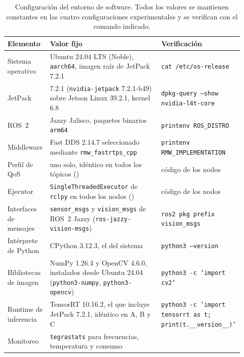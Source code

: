 \begin{table}[htbp]
  \centering
  \caption[Configuración del entorno de software]{Configuración del entorno de
  software. Todos los valores se mantienen constantes en las cuatro
  configuraciones experimentales y se verifican con el comando indicado.}
  \label{tab:software-environment}
  \begin{tabular}{@{}L{0.17\linewidth}L{0.47\linewidth}L{0.30\linewidth}@{}}
    \toprule
    \textbf{Elemento} & \textbf{Valor fijo} & \textbf{Verificación} \\
    \midrule
    Sistema operativo & Ubuntu 24.04 LTS (Noble), \texttt{aarch64}, imagen
      raíz de JetPack 7.2.1 & \texttt{cat /etc/os-release} \\
    JetPack & 7.2.1 (\texttt{nvidia-jetpack} 7.2.1-b49) sobre Jetson Linux
      39.2.1, kernel 6.8 & \texttt{dpkg-query --show nvidia-l4t-core} \\
    ROS~2 & Jazzy Jalisco, paquetes binarios \texttt{arm64} &
      \texttt{printenv ROS\_DISTRO} \\
    Middleware & Fast DDS 2.14.7 seleccionado mediante
      \texttt{rmw\_fastrtps\_cpp} & \texttt{printenv RMW\_IMPLEMENTATION} \\
    Perfil de QoS & uno solo, idéntico en todos los tópicos
      () & código de los nodos \\
    Ejecutor & \texttt{SingleThreadedExecutor} de \texttt{rclpy} en todos los
      nodos () & código de los nodos \\
    Interfaces de mensajes & \texttt{sensor\_msgs} y \texttt{vision\_msgs}
      de ROS~2 Jazzy (\texttt{ros-jazzy-vision-msgs}) & \texttt{ros2 pkg
      prefix vision\_msgs} \\
    Intérprete de Python & CPython 3.12.3, el del sistema &
      \texttt{python3 --version} \\
    Bibliotecas de imagen & NumPy 1.26.4 y OpenCV 4.6.0, instalados desde
      Ubuntu 24.04 (\texttt{python3-numpy}, \texttt{python3-opencv}) &
      \texttt{python3 -c 'import cv2'} \\
    Runtime de inferencia & TensorRT 10.16.2, el que incluye JetPack 7.2.1,
      idéntico en A, B y C &
      \texttt{python3 -c 'import tensorrt as t; print(t.\_\_version\_\_)'} \\
    Monitoreo & \texttt{tegrastats} para frecuencias, temperatura y consumo &
       \\
    \bottomrule
  \end{tabular}
\end{table}

